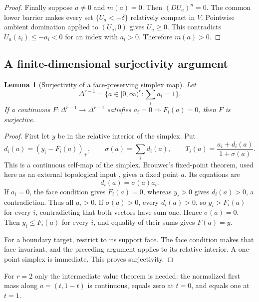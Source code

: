\documentclass[11pt,a4paper]{article}
\numberwithin{equation}{section}
\newtheorem{lemma}[theorem]{Lemma}
\theoremstyle{definition}
\theoremstyle{remark}
\begin{document}
\begin{proof}
Finally suppose $a\ne0$ and $m(a)=0$. Then $(DU_a)^n=0$.
The common lower barrier makes every set
$\{U_a<-\delta\}$ relatively compact in $V$. Pointwise
ambient domination applied to $(U_a,0)$ gives $U_a\geq0$.
This contradicts $U_a(z_i)\leq-a_i<0$ for an index with
$a_i>0$. Therefore $m(a)>0$.
\end{proof}

\subsection{A finite-dimensional surjectivity argument}

\begin{lemma}[Surjectivity of a face-preserving simplex map]
\label{lem:r3-simplex-surjectivity}
Let
\[
 \Delta^{r-1}=\{a\in[0,\infty)^r:\textstyle\sum_i a_i=1\}.
\]
If a continuous $F:\Delta^{r-1}\to\Delta^{r-1}$ satisfies
$a_i=0\Rightarrow F_i(a)=0$, then $F$ is surjective.
\end{lemma}

\begin{proof}
First let $y$ be in the relative interior of the simplex.
Put
\[
 d_i(a)=(y_i-F_i(a))_+,
 \qquad \sigma(a)=\sum_i d_i(a),
 \qquad
 T_i(a)=\frac{a_i+d_i(a)}{1+\sigma(a)}.
\]
This is a continuous self-map of the simplex. Brouwer's
fixed-point theorem, used here as an external topological
input \cite{Brouwer11}, gives a fixed point $a$. Its equations are
\[
 d_i(a)=\sigma(a)a_i.
\]
If $a_i=0$, the face condition gives $F_i(a)=0$, whereas
$y_i>0$ gives $d_i(a)>0$, a contradiction. Thus all
$a_i>0$. If $\sigma(a)>0$, every $d_i(a)>0$, so
$y_i>F_i(a)$ for every $i$, contradicting that both
vectors have sum one. Hence $\sigma(a)=0$. Then
$y_i\leq F_i(a)$ for every $i$, and equality of their sums
gives $F(a)=y$.

For a boundary target, restrict to its support face. The
face condition makes that face invariant, and the preceding
argument applies to its relative interior. A one-point
simplex is immediate. This proves surjectivity.
\end{proof}

For $r=2$ only the intermediate value theorem is needed:
the normalized first mass along $a=(t,1-t)$ is continuous,
equals zero at $t=0$, and equals one at $t=1$.
\end{document}
